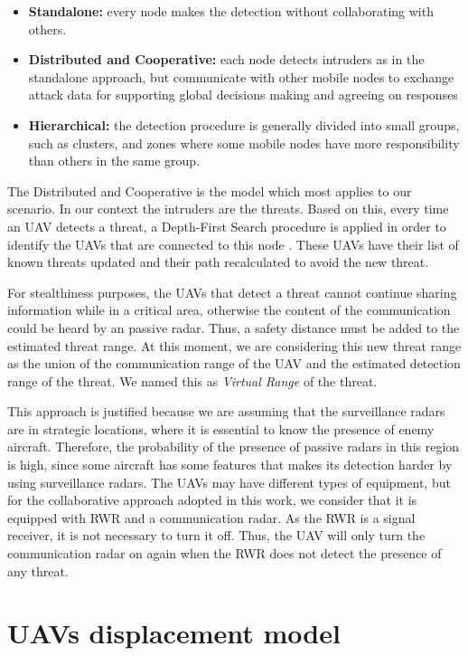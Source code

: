 \begin{itemize}
    \item \textbf{Standalone:} every node makes the detection without collaborating with others.
    \item \textbf{Distributed and Cooperative:} each node detects intruders as in the standalone approach, but communicate with other mobile nodes to exchange attack data for supporting global decisions making and agreeing on responses
    \item \textbf{Hierarchical:} the detection procedure is generally divided into small groups, such as clusters, and zones where some mobile nodes have more responsibility than others in the same group.

\end{itemize}

The Distributed and Cooperative is the model which most applies to our scenario. In our context the intruders are the threats. Based on this, every time an UAV detects a threat, a Depth-First Search procedure is applied in order to identify the UAVs that are connected to this node \cite{tarjan_1972}. These UAVs have their list of known threats updated and their path recalculated to avoid the new threat.

For stealthiness purposes, the UAVs that detect a threat cannot continue sharing information while in a critical area, otherwise the content of the communication could be heard by an passive radar. Thus, a safety distance must be added to the estimated threat range. At this moment, we are considering this new threat range as the union of the communication range of the UAV and the estimated detection range of the threat. We named this as \emph{Virtual Range} of the threat.

This approach is justified because we are assuming that the surveillance radars are in strategic locations, where it is essential to know the presence of enemy aircraft. Therefore, the probability of the presence of passive radars in this region is high, since some aircraft has some features that makes its detection harder by using surveillance radars. The UAVs may have different types of equipment, but for the collaborative approach adopted in this work, we consider that it is equipped with RWR and a communication radar. As the RWR is a signal receiver, it is not necessary to turn it off. Thus, the UAV will only turn the communication radar on again when the RWR does not detect the presence of any threat.  

\section{UAVs displacement model}

